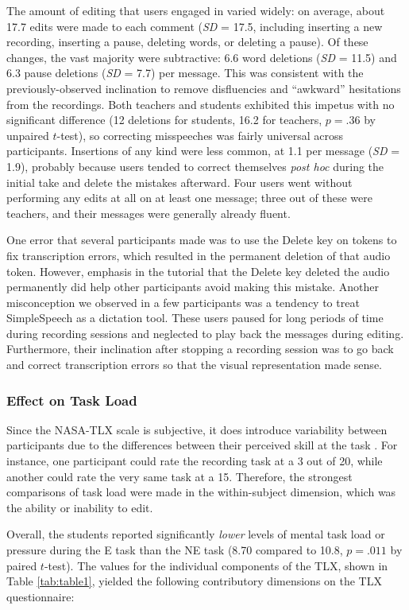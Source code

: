 The amount of editing that users engaged in varied widely: on average, about 17.7 edits were made to each comment (\textit{SD} = 17.5, including inserting a new recording, inserting a pause, deleting words, or deleting a pause). 
Of these changes, the vast majority were subtractive: 6.6 word deletions (\textit{SD} = 11.5) and 6.3 pause deletions (\textit{SD} = 7.7) per message.
This was consistent with the previously-observed inclination to remove disfluencies and ``awkward'' hesitations from the recordings.
Both teachers and students exhibited this impetus with no significant difference (12 deletions for students, 16.2 for teachers, $p=.36$ by unpaired $t$-test), so correcting misspeeches was fairly universal across participants.
Insertions of any kind were less common, at 1.1 per message (\textit{SD} = 1.9), probably because users tended to correct themselves \emph{post hoc} during the initial take and delete the mistakes afterward.
Four users went without performing any edits at all on at least one message; three out of these were teachers, and their messages were generally already fluent.

One error that several participants made was to use the Delete key on tokens to fix transcription errors, which resulted in the permanent deletion of that audio token. 
However, emphasis in the tutorial that the Delete key deleted the audio permanently did help other participants avoid making this mistake.
Another misconception we observed in a few participants was a tendency to treat SimpleSpeech as a dictation tool. 
These users paused for long periods of time during recording sessions and neglected to play back the messages during editing. 
Furthermore, their inclination after stopping a recording session was to go back and correct transcription errors so that the visual representation made sense.

\subsubsection{Effect on Task Load}
Since the NASA-TLX scale is subjective, it does introduce variability between participants due to the differences between their perceived skill at the task \cite{nasatlx}. 
For instance, one participant could rate the recording task at a 3 out of 20, while another could rate the very same task at a 15.
Therefore, the strongest comparisons of task load were made in the within-subject dimension, which was the ability or inability to edit.

Overall, the students reported significantly \emph{lower} levels of mental task load or pressure during the E task than the NE task (8.70 compared to 10.8, $p=.011$ by paired $t$-test). 
The values for the individual components of the TLX, shown in Table \ref{tab:table1}, yielded the following contributory dimensions on the TLX questionnaire:

